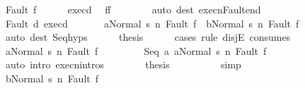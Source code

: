 \begin{isabellebody}
\ {\isacharparenleft}Fault\ f{\isacharprime}{\isacharparenright}\isanewline
\ \ \ \ \isamarkupfalse%
\ exec{\isacharunderscore}d{}\ \isamarkupfalse%
\ {\isachardoublequoteopen}f{\isacharprime}{\isacharequal}f{\isachardoublequoteclose}\isanewline
\ \ \ \ \ \ \isamarkupfalse%
\ {\isacharparenleft}auto\ dest{\isacharcolon}\ execn{\isacharunderscore}Fault{\isacharunderscore}end{\isacharparenright}\isanewline
\ \ \ \ \isamarkupfalse%
\ Fault\ d{}\ exec{\isacharunderscore}d{}\ \isanewline
\ \ \ \ \isamarkupfalse%
\ {\isachardoublequoteopen}{\isasymGamma}{\isasymturnstile}{\isasymlangle}a{}{\isacharcomma}Normal\ s{\isasymrangle}\ {\isacharequal}n{\isasymRightarrow}\ Fault\ f\ {\isasymor}\ {\isasymGamma}{\isasymturnstile}{\isasymlangle}b{}{\isacharcomma}Normal\ s{\isasymrangle}\ {\isacharequal}n{\isasymRightarrow}\ Fault\ f{\isachardoublequoteclose}\ \isanewline
\ \ \ \ \ \ \isamarkupfalse%
\ {\isacharparenleft}auto\ dest{\isacharcolon}\ Seq{\isachardot}hyps{\isacharparenright}\isanewline
\ \ \ \ \isamarkupfalse%
\ {\isacharquery}thesis\isanewline
\ \ \ \ \isamarkupfalse%
\ {\isacharparenleft}cases\ rule{\isacharcolon}\ disjE\ {\isacharbrackleft}consumes\ {}{\isacharbrackright}{\isacharparenright}\isanewline
\ \ \ \ \ \ \isamarkupfalse%
\ {\isachardoublequoteopen}{\isasymGamma}{\isasymturnstile}{\isasymlangle}a{}{\isacharcomma}Normal\ s{\isasymrangle}\ {\isacharequal}n{\isasymRightarrow}\ Fault\ f{\isachardoublequoteclose}\ \isanewline
\ \ \ \ \ \ \isamarkupfalse%
\ {\isachardoublequoteopen}{\isasymGamma}{\isasymturnstile}{\isasymlangle}Seq\ a{}\ a{}{\isacharcomma}Normal\ s{\isasymrangle}\ {\isacharequal}n{\isasymRightarrow}\ Fault\ f{\isachardoublequoteclose}\isanewline
\ \ \ \ \ \ \ \ \isamarkupfalse%
\ {\isacharparenleft}auto\ intro{\isacharcolon}\ execn{\isachardot}intros{\isacharparenright}\isanewline
\ \ \ \ \ \ \isamarkupfalse%
\ {\isacharquery}thesis\isanewline
\ \ \ \ \ \ \ \ \isamarkupfalse%
\ simp\isanewline
\ \ \ \ \isamarkupfalse%
\isanewline
\ \ \ \ \ \ \isamarkupfalse%
\ {\isachardoublequoteopen}{\isasymGamma}{\isasymturnstile}{\isasymlangle}b{}{\isacharcomma}Normal\ s{\isasymrangle}\ {\isacharequal}n{\isasymRightarrow}\ Fault\ f{\isachardoublequoteclose}\ \isanewline
\ \ \ \ \ \ \isamarkupfalse%

\end{isabellebody}
